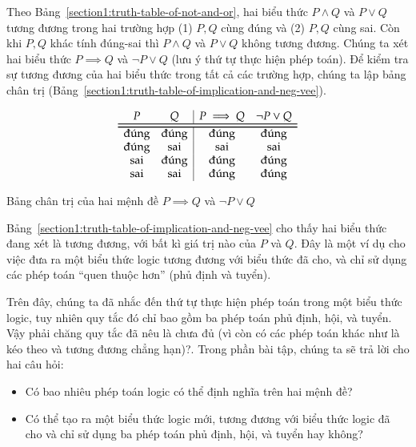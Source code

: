 Theo Bảng~\ref{section1:truth-table-of-not-and-or}, hai biểu thức $P\wedge Q$ và $P\vee Q$ tương đương trong hai trường hợp (1) $P, Q$ cùng đúng và (2) $P, Q$ cùng sai. Còn khi $P, Q$ khác tính đúng-sai thì $P\wedge Q$ và $P\vee Q$ không tương đương. Chúng ta xét hai biểu thức $P\implies Q$ và $\neg P \vee Q$ (lưu ý thứ tự thực hiện phép toán). Để kiểm tra sự tương đương của hai biểu thức trong tất cả các trường hợp, chúng ta lập bảng chân trị (Bảng~\ref{section1:truth-table-of-implication-and-neg-vee}).
\begin{table}[htp]
    \centering
    \[
        \begin{array}{cc|cc}
            P           & Q           & P\implies Q & \neg P\vee Q \\
            \toprule
            \bottomrule
            \text{đúng} & \text{đúng} & \text{đúng} & \text{đúng}  \\
            \text{đúng} & \text{sai}  & \text{sai}  & \text{sai}   \\
            \text{sai}  & \text{đúng} & \text{đúng} & \text{đúng}  \\
            \text{sai}  & \text{sai}  & \text{đúng} & \text{đúng}
        \end{array}
    \]
    \caption{Bảng chân trị của hai mệnh đề $P\implies Q$ và $\neg P\vee Q$}\label{section1:truth-table-of-implication-and-neg-vee}
\end{table}

Bảng~\ref{section1:truth-table-of-implication-and-neg-vee} cho thấy hai biểu thức đang xét là tương đương, với bất kì giá trị nào của $P$ và $Q$. Đây là một ví dụ cho việc đưa ra một biểu thức logic tương đương với biểu thức đã cho, và chỉ sử dụng các phép toán ``quen thuộc hơn'' (phủ định và tuyển).

Trên đây, chúng ta đã nhắc đến thứ tự thực hiện phép toán trong một biểu thức logic, tuy nhiên quy tắc đó chỉ bao gồm ba phép toán phủ định, hội, và tuyển. Vậy phải chăng quy tắc đã nêu là chưa đủ (vì còn có các phép toán khác như là kéo theo và tương đương chẳng hạn)?. Trong phần bài tập, chúng ta sẽ trả lời cho hai câu hỏi:
\begin{itemize}[itemsep=0pt]
    \item Có bao nhiêu phép toán logic có thể định nghĩa trên hai mệnh đề?
    \item Có thể tạo ra một biểu thức logic mới, tương đương với biểu thức logic đã cho và chỉ sử dụng ba phép toán phủ định, hội, và tuyển hay không?
\end{itemize}


